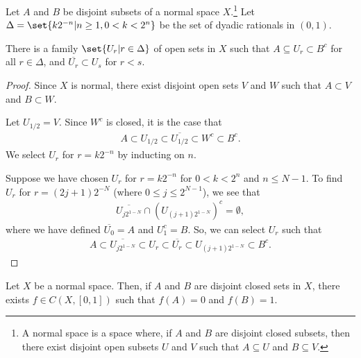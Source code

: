 \documentclass[10pt]{mypackage}
\begin{document}
\begin{lemma}
  Let $A$ and $B$ be disjoint subsets of a normal space $X$.\footnote{A normal space is a space where, if $A$ and $B$ are disjoint closed subsets, then there exist disjoint open subsets $U$ and $V$ such that $A\subseteq U$ and $B\subseteq V$.} Let $\Delta = \set{k2^{-n}| n\geq 1, 0 < k < 2^n}$ be the set of dyadic rationals in $\left(0,1\right)$.\newline

  There is a family $\set{U_r| r\in \Delta}$ of open sets in $X$ such that $A\subseteq U_r\subset B^{c}$ for all $r\in \Delta$, and $\overline{U_r}\subset U_s$ for $r < s$.
\end{lemma}
\begin{proof}
  Since $X$ is normal, there exist disjoint open sets $V$ and $W$ such that $A\subset V$ and $B\subset W$.\newline

  Let $U_{1/2} = V$. Since $W^{c}$ is closed, it is the case that
  \begin{align*}
    A\subset U_{1/2}\subset \overline{U_{1/2}}\subset W^{c}\subset B^{c}.
  \end{align*}
  We select $U_{r}$ for $r = k2^{-n}$ by inducting on $n$.\newline

  Suppose we have chosen $U_r$ for $r = k2^{-n}$ for $0 < k < 2^{n}$ and $n\leq N-1$. To find $U_r$ for $r = \left(2j+1\right)2^{-N}$ (where $0\leq j \leq 2^{N-1}$), we see that
  \begin{align*}
    \overline{U_{j2^{1-N}}}\cap \left(U_{\left(j+1\right)2^{1-N}}\right)^c = \emptyset,
  \end{align*}
  where we have defined $\overline{U_0}= A$ and $U_1^c = B$. So, we can select $U_{r}$ such that
  \begin{align*}
    A\subset \overline{U_{j2^{1-N}}}\subset U_r \subset \overline{U_r} \subset U_{\left(j+1\right)2^{1-N}}\subset B^{c}.
  \end{align*}
\end{proof}
\begin{theorem}
  Let $X$ be a normal space. Then, if $A$ and $B$ are disjoint closed sets in $X$, there exists $f\in C\left(X,[0,1]\right)$ such that $f(A) = 0$ and $f(B) = 1$.
\end{theorem}
\end{document}
